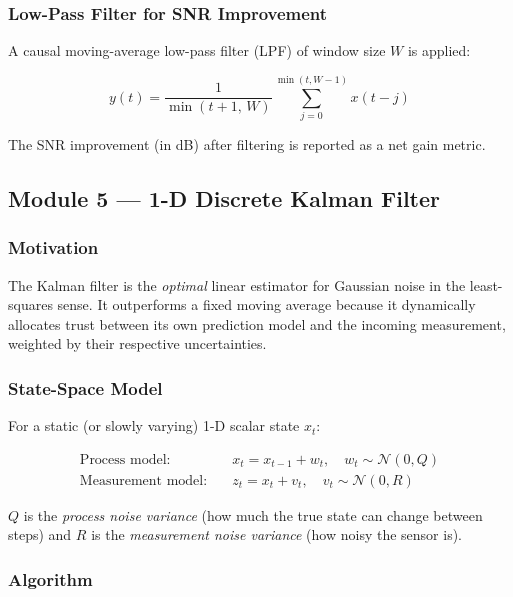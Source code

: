 \documentclass[12pt, a4paper]{article}
\begin{document}
\subsubsection{Low-Pass Filter for SNR Improvement}

A causal moving-average low-pass filter (LPF) of window size $W$ is applied:

\begin{equation}
  y(t) = \frac{1}{\min(t+1,\, W)}\sum_{j=0}^{\min(t, W-1)} x(t-j)
\end{equation}

The SNR improvement (in dB) after filtering is reported as a net gain metric.

\subsection{Module 5 --- 1-D Discrete Kalman Filter}

\subsubsection{Motivation}

The Kalman filter is the \emph{optimal} linear estimator for Gaussian noise in the
least-squares sense. It outperforms a fixed moving average because it dynamically
allocates trust between its own prediction model and the incoming measurement,
weighted by their respective uncertainties.

\subsubsection{State-Space Model}

For a static (or slowly varying) 1-D scalar state $x_t$:

\begin{align}
  \text{Process model:}     \quad & x_t = x_{t-1} + w_t, \quad w_t \sim \mathcal{N}(0, Q) \\
  \text{Measurement model:} \quad & z_t = x_t + v_t,     \quad v_t \sim \mathcal{N}(0, R)
\end{align}

$Q$ is the \emph{process noise variance} (how much the true state can change between
steps) and $R$ is the \emph{measurement noise variance} (how noisy the sensor is).

\subsubsection{Algorithm}
\end{document}
